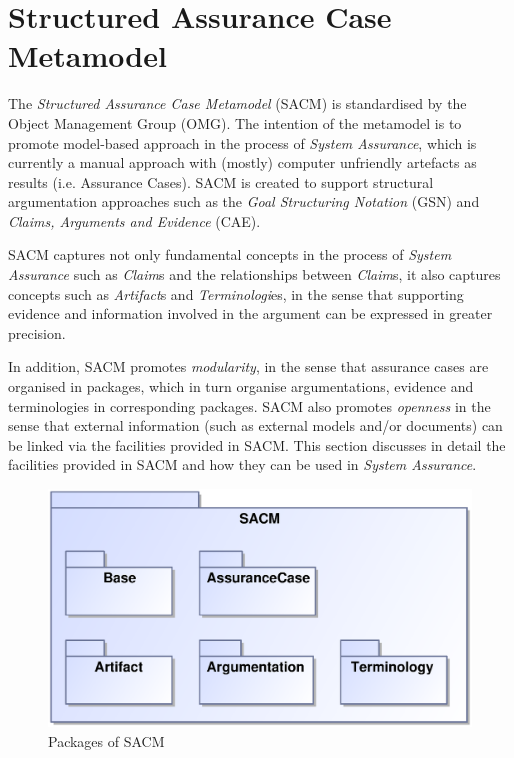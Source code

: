 \section{Structured Assurance Case Metamodel}
\label{sec:sec2}
The \textit{Structured Assurance Case Metamodel} (SACM) is standardised by the Object Management Group (OMG). The intention of the metamodel is to promote model-based approach in the process of \textit{System Assurance}, which is currently a manual approach with (mostly) computer unfriendly artefacts as results (i.e. Assurance Cases). SACM is created to support structural argumentation approaches such as the \textit{Goal Structuring Notation} (GSN) and \textit{Claims, Arguments and Evidence} (CAE). 

SACM captures not only fundamental concepts in the process of \textit{System Assurance} such as \textit{Claim}s and the relationships between \textit{Claim}s, it also captures concepts such as \textit{Artifact}s and \textit{Terminologi}es, in the sense that supporting evidence and information involved in the argument can be expressed in greater precision. 

In addition, SACM promotes \textit{modularity}, in the sense that assurance cases are organised in packages, which in turn organise argumentations, evidence and terminologies in corresponding packages. SACM also promotes \textit{openness} in the sense that external information (such as external models and/or documents) can be linked via the facilities provided in SACM. This section discusses in detail the facilities provided in SACM and how they can be used in \textit{System Assurance}.

\begin{figure}
	\centering
	\includegraphics[width=0.6\linewidth]{fig/Overview.eps}
	\caption{Packages of SACM}
	\label{fig:overview}
\end{figure}

